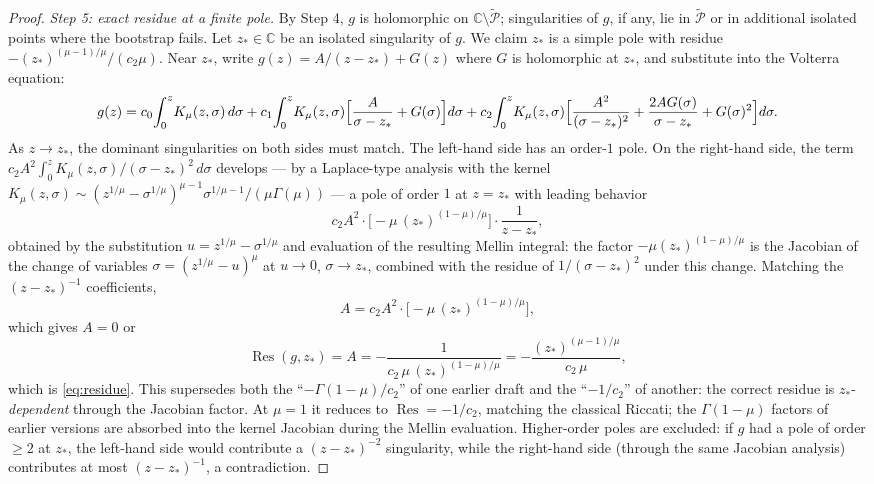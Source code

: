 \documentclass[11pt]{article}
\theoremstyle{definition}
\theoremstyle{remark}
\DeclareMathOperator{\Res}{Res}
\begin{document}
\begin{proof}
\emph{Step 5: exact residue at a finite pole.} By Step 4, $g$ is holomorphic on $\mathbb{C}\setminus\widetilde{\mathcal{P}}$; singularities of $g$, if any, lie in $\widetilde{\mathcal{P}}$ or in additional isolated points where the bootstrap fails. Let $z_{*}\in\mathbb{C}$ be an isolated singularity of $g$. We claim $z_{*}$ is a simple pole with residue $-(z_{*})^{(\mu-1)/\mu}/(c_{2}\mu)$. Near $z_{*}$, write $g(z)=A/(z-z_{*})+G(z)$ where $G$ is holomorphic at $z_{*}$, and substitute into the Volterra equation:
\begin{equation}
g(z)=c_{0}\!\int_{0}^{z}\!K_{\mu}(z,\sigma)\,d\sigma
+c_{1}\!\int_{0}^{z}\!K_{\mu}(z,\sigma)\Bigl[\frac{A}{\sigma-z_{*}}+G(\sigma)\Bigr]d\sigma
+c_{2}\!\int_{0}^{z}\!K_{\mu}(z,\sigma)\Bigl[\frac{A^{2}}{(\sigma-z_{*})^{2}}+\frac{2AG(\sigma)}{\sigma-z_{*}}+G(\sigma)^{2}\Bigr]d\sigma.
\label{eq:residue-substitution}
\end{equation}
As $z\to z_{*}$, the dominant singularities on both sides must match. The left-hand side has an order-$1$ pole. On the right-hand side, the term $c_{2}A^{2}\int_{0}^{z}K_{\mu}(z,\sigma)/(\sigma-z_{*})^{2}\,d\sigma$ develops --- by a Laplace-type analysis with the kernel $K_{\mu}(z,\sigma)\sim(z^{1/\mu}-\sigma^{1/\mu})^{\mu-1}\sigma^{1/\mu-1}/(\mu\Gamma(\mu))$ --- a pole of order $1$ at $z=z_{*}$ with leading behavior
\begin{equation}
c_{2}A^{2}\cdot\bigl[-\mu\,(z_{*})^{(1-\mu)/\mu}\bigr]\cdot\frac{1}{z-z_{*}},
\label{eq:residue-balance}
\end{equation}
obtained by the substitution $u=z^{1/\mu}-\sigma^{1/\mu}$ and evaluation of the resulting Mellin integral: the factor $-\mu(z_{*})^{(1-\mu)/\mu}$ is the Jacobian of the change of variables $\sigma=(z^{1/\mu}-u)^{\mu}$ at $u\to 0$, $\sigma\to z_{*}$, combined with the residue of $1/(\sigma-z_{*})^{2}$ under this change. Matching the $(z-z_{*})^{-1}$ coefficients,
\begin{equation}
A=c_{2}A^{2}\cdot\bigl[-\mu\,(z_{*})^{(1-\mu)/\mu}\bigr],
\label{eq:residue-match}
\end{equation}
which gives $A=0$ or
\begin{equation}
\Res(g,z_{*})=A=-\frac{1}{c_{2}\,\mu\,(z_{*})^{(1-\mu)/\mu}}=-\frac{(z_{*})^{(\mu-1)/\mu}}{c_{2}\,\mu},
\label{eq:residue-value}
\end{equation}
which is \eqref{eq:residue}. This supersedes both the ``$-\Gamma(1-\mu)/c_{2}$'' of one earlier draft and the ``$-1/c_{2}$'' of another: the correct residue is $z_{*}$-\emph{dependent} through the Jacobian factor. At $\mu=1$ it reduces to $\Res=-1/c_{2}$, matching the classical Riccati; the $\Gamma(1-\mu)$ factors of earlier versions are absorbed into the kernel Jacobian during the Mellin evaluation. Higher-order poles are excluded: if $g$ had a pole of order $\ge 2$ at $z_{*}$, the left-hand side would contribute a $(z-z_{*})^{-2}$ singularity, while the right-hand side (through the same Jacobian analysis) contributes at most $(z-z_{*})^{-1}$, a contradiction.


\end{proof}
\end{document}
